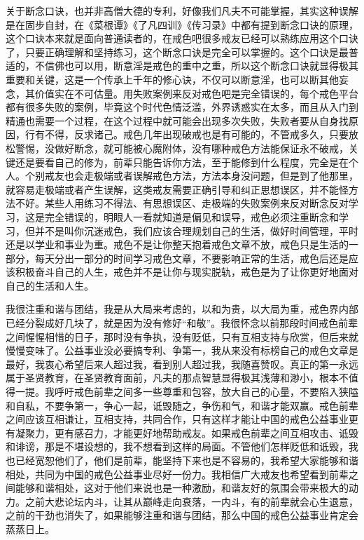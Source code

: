 关于断念口诀，也并非高僧大德的专利，好像我们凡夫不可能掌握，其实这种误解是在固步自封，在《菜根谭》《了凡四训》《传习录》中都有提到断念口诀的原理，这个口诀本来就是面向普通读者的，在戒色吧很多戒友已经可以熟练应用这个口诀了，只要正确理解和坚持练习，这个断念口诀是完全可以掌握的。这个口诀是最普适的，不信佛也可以用，断意淫是戒色的重中之重，所以这个断念口诀就显得极其重要和关键，这是一个传承上千年的修心诀，不仅可以断意淫，也可以断其他妄念，其价值实在不可估量。用失败案例来反对戒色吧是完全错误的，每个戒色平台都有很多失败的案例，毕竟这个时代色情泛滥，外界诱惑实在太多，而且从入门到精通也需要一个过程，在这个过程中就可能会出现多次失败，失败者要从自身找原因，行有不得，反求诸己。戒色几年出现破戒也是有可能的，不管戒多久，只要放松警惕，没做好断念，就可能被心魔附体，没有哪种戒色方法能保证永不破戒，关键还是要看自己的修为，前辈只能告诉你方法，至于能修到什么程度，完全是在个人。个别戒友也会走极端或者误解戒色方法，方法本身没问题，但是到了他那里，就容易走极端或者产生误解，这类戒友需要正确引导和纠正思想误区，并不能怪方法不好。某些人用练习不得法、有思想误区、走极端的失败案例来反对断念反对学习，这是完全错误的，明眼人一看就知道是偏见和误导，戒色必须注重断念和学习，但并不是叫你沉迷戒色，我们应该合理规划自己的生活，做好时间管理，平时还是以学业和事业为重。戒色不是让你整天抱着戒色文章不放，戒色只是生活的一部分，每天分出一部分的时间学习戒色文章，不要影响正常的生活，戒色后还是应该积极奋斗自己的人生，戒色并不是让你与现实脱轨，戒色是为了让你更好地面对自己的生活和人生。

我很注重和谐与团结，我是从大局来考虑的，以和为贵，以大局为重，戒色界内部已经分裂成好几块了，就是因为没有修好“和敬”。我很怀念以前那段时间戒色前辈之间惺惺相惜的日子，那时没有争执，没有贬低，只有互相支持与欣赏，但后来就慢慢变味了。公益事业没必要搞专利、争第一，我从来没有标榜自己的戒色文章是最好，我衷心希望后来人超过我，看到别人超过我，我随喜赞叹。真正的第一永远属于圣贤教育，在圣贤教育面前，凡夫的那点智慧显得极其浅薄和渺小，根本不值得一提。我呼吁戒色前辈之间多一些尊重和包容，放大自己的心量，不要陷入狭隘和自私，不要争第一，争心一起，诋毁随之，争伤和气，和谐才能双赢。戒色前辈之间应该互相谦让，互相支持，共同合作，只有这样才能让中国的戒色公益事业更有凝聚力，更有感召力，才能更好地帮助戒友。如果戒色前辈之间互相攻击、诋毁和诽谤，那是不堪设想的，我不想看到这样的局面。不管他们怎样贬低和诋毁，我也已经宽恕他们了，他们是前辈，能坚持下来也是不容易的，我希望大家能够和谐相处，共同为中国的戒色公益事业尽好一份力。我相信广大戒友也希望看到前辈之间能够和谐相处，这对于他们来说也是一种激励，和谐友好的氛围会带来极大的动力。之前大悲论坛内斗，让其从巅峰走向衰落，一内斗，有的前辈就会心生退意，之前的干劲也消失了，如果能够注重和谐与团结，那么中国的戒色公益事业肯定会蒸蒸日上。
